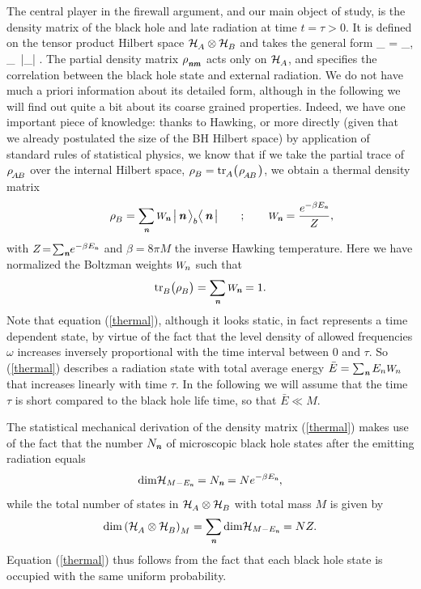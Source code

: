 \documentclass[12pt]{article}%
\def\spc{\hspace{.5pt}}
\def\be{\begin{equation}}
\def\ee{\end{equation}}
\begin{document}
The central player in the firewall argument, and our main object of study, is the density matrix of the black hole and late radiation at time $t= \tau> 0$. It is defined on
the tensor product Hilbert space ${\cal H}_\AA\otimes {\cal H}_\BB$ and takes the general form
\bea
\label{rhonm}
\rho_{\abAB} = \sum_{\nom, \mom}\spc  \rho_\nm \, \bigl|\spc \nom\spc \ra_\bB \la\spc \mom\spc \bigr|  .
\eea
The partial density matrix $\rho_\nm$  acts only on ${\cal H}_\AA$,
and specifies the correlation between the black hole state and external radiation.  
We do not have much a priori information about its detailed form, although in the following we will find out
quite a bit about its coarse grained properties. Indeed, we have one important piece of knowledge:
thanks to Hawking, or more directly (given that we already postulated the size of the BH Hilbert space) by application of standard rules of  statistical physics, we know that if we
take the partial trace of $\rho_\abAB$ over the internal Hilbert space, $\rho_\BB =  \tr_\AA\bigl(\spc \rho_\abAB\spc\bigr) $,
we obtain a thermal density matrix  
\be
\label{thermal}
\qquad \rho_\BB  =   
\sum_\nom \pp_\nom\, \bigll|\, \nom \, \ra_\bB \la\, \nom \, \bigrr| \qquad ; \qquad \pp_\nom = \frac{e^{-\betaH E_\nom}}{ Z} ,
\ee
with $Z\! =\! \sum_{ \textit{\textbf n}}\!  e^{-\beta E_{ \textit{\textbf n}}}$ and $\beta = 8\pi M$ the inverse Hawking temperature. Here we have normalized the Boltzman weights $\pp_n$ such that 
\be
\tr_\BB \bigr( \rho_\BB\bigr) = \sum_\nom \pp_\nom = 1.
\ee 
Note that equation (\ref{thermal}), although it looks static, in fact represents a time dependent state, by virtue of the fact that the level density of allowed frequencies $\omega$
increases inversely proportional with the time interval between $0$ and  $\tau$. So (\ref{thermal}) describes a radiation state with total 
average energy $\bar{E} = \sum_\nom E_n \pp_n$ that increases linearly with time $\tau$. In the following we will assume that the time $\tau$ is short compared to
the black hole life time, so that $\bar{E} \ll M$.

The statistical mechanical derivation of the density matrix (\ref{thermal}) makes use of the fact that the number $N_{ \textit{\textbf n}}$ of microscopic black hole states after the emitting radiation equals 
$$
{\rm dim}{\cal H}_{M-E_\nom} = N_\nom  = N e^{-\beta E_\nom},
$$
while the total number of states in ${\cal H}_\AA\otimes {\cal H}_\BB$ with total mass $M$ is given by 
\be
{\rm dim} \left({\cal H}_\AA\otimes {\cal H}_\BB\right)_{M} =\sum_\nom {\rm dim} {\cal H}_{M-E_\nom}= NZ.
\ee
Equation (\ref{thermal}) thus follows from the fact that each black hole state is occupied with the same uniform probability. 
\end{document}
